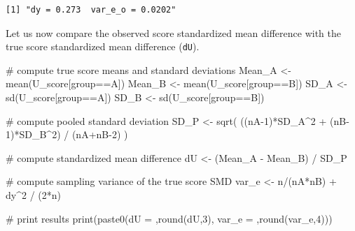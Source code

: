 \documentclass[
  letterpaper,
  DIV=11,
  numbers=noendperiod]{scrreprt}
\newenvironment{Shaded}{\begin{snugshade}}{\end{snugshade}}
\newcommand{\CommentTok}[1]{\textcolor[rgb]{0.37,0.37,0.37}{#1}}
\newcommand{\DecValTok}[1]{\textcolor[rgb]{0.68,0.00,0.00}{#1}}
\newcommand{\FunctionTok}[1]{\textcolor[rgb]{0.28,0.35,0.67}{#1}}
\newcommand{\NormalTok}[1]{\textcolor[rgb]{0.00,0.23,0.31}{#1}}
\newcommand{\OtherTok}[1]{\textcolor[rgb]{0.00,0.23,0.31}{#1}}
\newcommand{\SpecialCharTok}[1]{\textcolor[rgb]{0.37,0.37,0.37}{#1}}
\newcommand{\StringTok}[1]{\textcolor[rgb]{0.13,0.47,0.30}{#1}}
\begin{document}
\begin{verbatim}
[1] "dy = 0.273  var_e_o = 0.0202"
\end{verbatim}

Let us now compare the observed score standardized mean difference with
the true score standardized mean difference (\texttt{dU}).

\begin{Shaded}
\begin{Highlighting}[]
\CommentTok{\# compute true score means and standard deviations}
\NormalTok{Mean\_A }\OtherTok{\textless{}{-}} \FunctionTok{mean}\NormalTok{(U\_score[group}\SpecialCharTok{==}\StringTok{\textquotesingle{}A\textquotesingle{}}\NormalTok{])}
\NormalTok{Mean\_B }\OtherTok{\textless{}{-}} \FunctionTok{mean}\NormalTok{(U\_score[group}\SpecialCharTok{==}\StringTok{\textquotesingle{}B\textquotesingle{}}\NormalTok{])}
\NormalTok{SD\_A }\OtherTok{\textless{}{-}} \FunctionTok{sd}\NormalTok{(U\_score[group}\SpecialCharTok{==}\StringTok{\textquotesingle{}A\textquotesingle{}}\NormalTok{])}
\NormalTok{SD\_B }\OtherTok{\textless{}{-}} \FunctionTok{sd}\NormalTok{(U\_score[group}\SpecialCharTok{==}\StringTok{\textquotesingle{}B\textquotesingle{}}\NormalTok{])}

\CommentTok{\# compute pooled standard deviation}
\NormalTok{SD\_P }\OtherTok{\textless{}{-}} \FunctionTok{sqrt}\NormalTok{( ((nA}\DecValTok{{-}1}\NormalTok{)}\SpecialCharTok{*}\NormalTok{SD\_A}\SpecialCharTok{\^{}}\DecValTok{2} \SpecialCharTok{+}\NormalTok{ (nB}\DecValTok{{-}1}\NormalTok{)}\SpecialCharTok{*}\NormalTok{SD\_B}\SpecialCharTok{\^{}}\DecValTok{2}\NormalTok{) }\SpecialCharTok{/}\NormalTok{ (nA}\SpecialCharTok{+}\NormalTok{nB}\DecValTok{{-}2}\NormalTok{) )}

\CommentTok{\# compute standardized mean difference}
\NormalTok{dU }\OtherTok{\textless{}{-}}\NormalTok{ (Mean\_A }\SpecialCharTok{{-}}\NormalTok{ Mean\_B) }\SpecialCharTok{/}\NormalTok{ SD\_P}

\CommentTok{\# compute sampling variance of the true score SMD}
\NormalTok{var\_e }\OtherTok{\textless{}{-}}\NormalTok{ n}\SpecialCharTok{/}\NormalTok{(nA}\SpecialCharTok{*}\NormalTok{nB) }\SpecialCharTok{+}\NormalTok{ dy}\SpecialCharTok{\^{}}\DecValTok{2} \SpecialCharTok{/}\NormalTok{ (}\DecValTok{2}\SpecialCharTok{*}\NormalTok{n)}

\CommentTok{\# print results}
\FunctionTok{print}\NormalTok{(}\FunctionTok{paste0}\NormalTok{(}\StringTok{\textquotesingle{}dU = \textquotesingle{}}\NormalTok{,}\FunctionTok{round}\NormalTok{(dU,}\DecValTok{3}\NormalTok{),}\StringTok{\textquotesingle{}  var\_e = \textquotesingle{}}\NormalTok{,}\FunctionTok{round}\NormalTok{(var\_e,}\DecValTok{4}\NormalTok{)))}
\end{Highlighting}
\end{Shaded}
\end{document}
